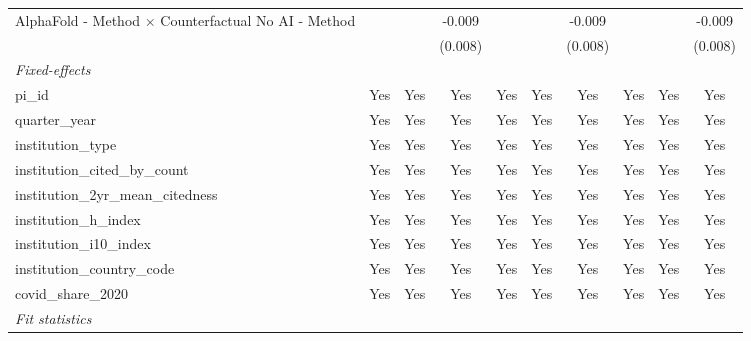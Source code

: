 \begin{tabular}{lccccccccc}
   AlphaFold - Method $\times$ Counterfactual No AI - Method   &              &               & -0.009        &             &              & -0.009        &           &         & -0.009\\   
                                                               &              &               & (0.008)       &             &              & (0.008)       &           &         & (0.008)\\   
   \midrule
   \emph{Fixed-effects}\\
   pi\_id                                                      & Yes          & Yes           & Yes           & Yes         & Yes          & Yes           & Yes       & Yes     & Yes\\  
   quarter\_year                                               & Yes          & Yes           & Yes           & Yes         & Yes          & Yes           & Yes       & Yes     & Yes\\  
   institution\_type                                           & Yes          & Yes           & Yes           & Yes         & Yes          & Yes           & Yes       & Yes     & Yes\\  
   institution\_cited\_by\_count                               & Yes          & Yes           & Yes           & Yes         & Yes          & Yes           & Yes       & Yes     & Yes\\  
   institution\_2yr\_mean\_citedness                           & Yes          & Yes           & Yes           & Yes         & Yes          & Yes           & Yes       & Yes     & Yes\\  
   institution\_h\_index                                       & Yes          & Yes           & Yes           & Yes         & Yes          & Yes           & Yes       & Yes     & Yes\\  
   institution\_i10\_index                                     & Yes          & Yes           & Yes           & Yes         & Yes          & Yes           & Yes       & Yes     & Yes\\  
   institution\_country\_code                                  & Yes          & Yes           & Yes           & Yes         & Yes          & Yes           & Yes       & Yes     & Yes\\  
   covid\_share\_2020                                          & Yes          & Yes           & Yes           & Yes         & Yes          & Yes           & Yes       & Yes     & Yes\\  
   \midrule
   \emph{Fit statistics}\\

\end{tabular}
